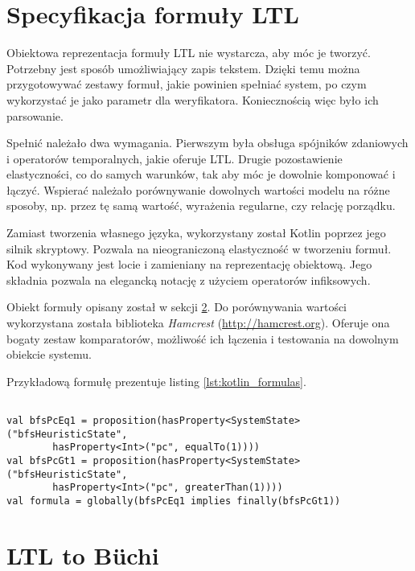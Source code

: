 \section{Specyfikacja formuły LTL} \label{sec:LTL_formula_spec}

Obiektowa reprezentacja formuły LTL nie wystarcza, aby móc je tworzyć.
Potrzebny jest sposób umożliwiający zapis tekstem.
Dzięki temu można przygotowywać zestawy formuł, jakie powinien spełniać system, po czym wykorzystać je jako parametr dla weryfikatora.
Koniecznością więc było ich parsowanie.

Spełnić należało dwa wymagania.
Pierwszym była obsługa spójników zdaniowych i operatorów temporalnych, jakie oferuje LTL.
Drugie pozostawienie elastyczności, co do samych warunków, tak aby móc je dowolnie komponować i łączyć.
Wspierać należało porównywanie dowolnych wartości modelu na różne sposoby, np. przez tę samą wartość, wyrażenia regularne, czy relację porządku.

Zamiast tworzenia własnego języka, wykorzystany został Kotlin poprzez jego silnik skryptowy.
Pozwala na nieograniczoną elastyczność w tworzeniu formuł.
Kod wykonywany jest locie i zamieniany na reprezentację obiektową.
Jego składnia pozwala na elegancką notację z użyciem operatorów infiksowych.

Obiekt formuły opisany został w sekcji \ref{sec:ltl2buchi}.
Do porównywania wartości wykorzystana została biblioteka \textit{Hamcrest} (\url{http://hamcrest.org}).
Oferuje ona bogaty zestaw komparatorów, możliwość ich łączenia i testowania na dowolnym obiekcie systemu.

Przykładową formułę prezentuje listing \ref{lst:kotlin_formulas}.

\begin{minipage}{\linewidth}
\begin{lstlisting}[caption={Przykładowa formuły LTL w języku Kotlin.},captionpos=b,label={lst:kotlin_formulas}]

val bfsPcEq1 = proposition(hasProperty<SystemState>("bfsHeuristicState", 
        hasProperty<Int>("pc", equalTo(1))))
val bfsPcGt1 = proposition(hasProperty<SystemState>("bfsHeuristicState",
        hasProperty<Int>("pc", greaterThan(1))))
val formula = globally(bfsPcEq1 implies finally(bfsPcGt1))

\end{lstlisting}
\end{minipage}


\section{LTL to Büchi} \label{sec:ltl2buchi}

